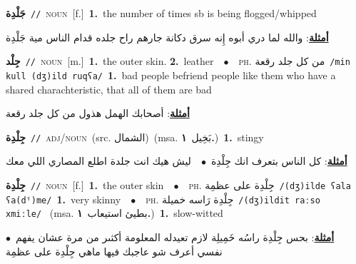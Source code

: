 \documentclass[10pt,a4paper,twoside]{article} %
\begin{document}
\begin{multicols}{2}
{\setlength\topsep{0pt}\textbf{\foreignlanguage{arabic}{جَلْدِة}}\ {\color{gray}\texttt{//}\color{black}}\ \textsc{noun}\ [f.]\ \textbf{1.}~the number of times sb is being flogged/whipped\  \begin{flushright}\color{gray}\foreignlanguage{arabic}{\textbf{\underline{\foreignlanguage{arabic}{أمثلة}}}: والله لما دري أبوه إِنه سرق دكانة جارهم راح جلده قدام الناس مية جَلْدِة}\end{flushright}\color{black}} \vspace{2mm}

{\setlength\topsep{0pt}\textbf{\foreignlanguage{arabic}{جِلْد}}\ {\color{gray}\texttt{//}\color{black}}\ \textsc{noun}\ [m.]\ \textbf{1.}~the outer skin.  \textbf{2.}~leather\ \ $\bullet$\ \ \textsc{ph.} \color{gray} \foreignlanguage{arabic}{من كل جلد رقعة}\color{black}\ {\color{gray}\texttt{/{\sffamily min kull (dʒ)ild ruqʕa}/}\color{black}}\ \textbf{1.}~bad people befriend people like them who have a shared charachteristic, that all of them are bad\  \begin{flushright}\color{gray}\foreignlanguage{arabic}{\textbf{\underline{\foreignlanguage{arabic}{أمثلة}}}: أصحابك الهمل هذول من كل جلد رقعة}\end{flushright}\color{black}} \vspace{2mm}

{\setlength\topsep{0pt}\textbf{\foreignlanguage{arabic}{جِلْدِة}}\ {\color{gray}\texttt{//}\color{black}}\ \textsc{adj/noun}\ (src. \color{gray}\foreignlanguage{arabic}{الشمال}\color{black})\ \color{gray}(msa. \foreignlanguage{arabic}{بَخِيل}~\foreignlanguage{arabic}{\textbf{١.}})\color{black}\ \textbf{1.}~stingy\  \begin{flushright}\color{gray}\foreignlanguage{arabic}{\textbf{\underline{\foreignlanguage{arabic}{أمثلة}}}: كل الناس بتعرف انك جِلْدِة\ $\bullet$\ \  ليش هيك انت جلدة اطلع المصاري اللي معك}\end{flushright}\color{black}} \vspace{2mm}

{\setlength\topsep{0pt}\textbf{\foreignlanguage{arabic}{جِلْدِة}}\ {\color{gray}\texttt{//}\color{black}}\ \textsc{noun}\ [f.]\ \textbf{1.}~the outer skin\ \ $\bullet$\ \ \textsc{ph.} \color{gray} \foreignlanguage{arabic}{جِلْدِة على عظمِة}\color{black}\ {\color{gray}\texttt{/{\sffamily (dʒ)ilde ʕala ʕa(dˤ)me}/}\color{black}}\ \textbf{1.}~very skinny\ \ $\bullet$\ \ \textsc{ph.} \color{gray} \foreignlanguage{arabic}{جِلْدِة رَاسه خميلة}\color{black}\ {\color{gray}\texttt{/{\sffamily (dʒ)ildit raːso xmiːle}/}\color{black}}\ \color{gray} (msa. \foreignlanguage{arabic}{بطيئ استيعاب}~\foreignlanguage{arabic}{\textbf{١.}})\color{black}\ \textbf{1.}~slow-witted\  \begin{flushright}\color{gray}\foreignlanguage{arabic}{\textbf{\underline{\foreignlanguage{arabic}{أمثلة}}}: بحس جِلْدِة راسُه خَمِيلِة لازم تعيدله المعلومة أكثىر من مرة عشان يفهم\ $\bullet$\ \  نفسي أعرف شو عاجبك فيها ماهي جِلْدِة على عظمِة}\end{flushright}\color{black}} \vspace{2mm}


\end{multicols}
\end{document}
